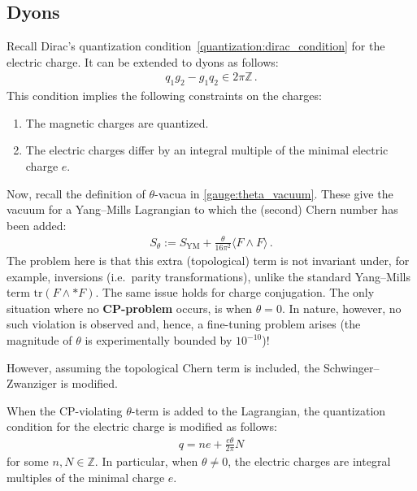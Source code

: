 \subsection{Dyons}


    \begin{property}
        Recall Dirac's quantization condition~\ref{quantization:dirac_condition} for the electric charge. It can be extended to dyons as follows:
        \begin{gather}
            q_1g_2-g_1q_2 \in 2\pi\mathbb{Z}\,.
        \end{gather}
        This condition implies the following constraints on the charges:
        \begin{enumerate}
            \item The magnetic charges are quantized.
            \item The electric charges differ by an integral multiple of the minimal electric charge $e$.
        \end{enumerate}
    \end{property}

    Now, recall the definition of $\theta$-vacua in \cref{gauge:theta_vacuum}. These give the vacuum for a Yang--Mills Lagrangian to which the (second) Chern number has been added:
    \begin{gather}
        S_\theta := S_{\text{YM}} + \frac{\theta}{16\pi^2}\langle F\wedge F\rangle\,.
    \end{gather}
    The problem here is that this extra (topological) term is not invariant under, for example, inversions (i.e.~parity transformations), unlike the standard Yang--Mills term $\mathrm{tr}(F\wedge\ast F)$. The same issue holds for charge conjugation. The only situation where no \textbf{CP-problem} occurs, is when $\theta=0$. In nature, however, no such violation is observed and, hence, a fine-tuning problem arises (the magnitude of $\theta$ is experimentally bounded by $10^{-10}$)!

    However, assuming the topological Chern term is included, the Schwinger--Zwanziger is modified.
    \begin{property}
        When the CP-violating $\theta$-term is added to the Lagrangian, the quantization condition for the electric charge is modified as follows:
        \begin{gather}
            q = ne + \frac{e\theta}{2\pi}N
        \end{gather}
        for some $n,N\in\mathbb{Z}$. In particular, when $\theta\neq0$, the electric charges are integral multiples of the minimal charge $e$.
    \end{property}

